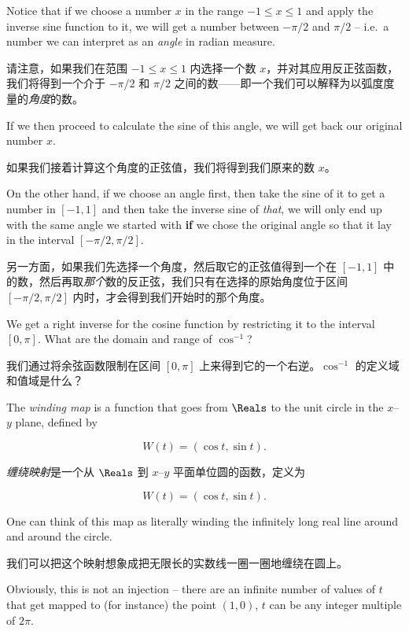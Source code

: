 Notice that if we choose a number $x$ in the range $-1 \leq x \leq 1$ and apply
the inverse sine function to it, we will get a number between $-\pi/2$ and 
$\pi/2$ -- i.e.\ a number we can interpret as an \emph{angle} in radian measure.

请注意，如果我们在范围 $-1 \leq x \leq 1$ 内选择一个数 $x$，并对其应用反正弦函数，我们将得到一个介于 $-\pi/2$ 和 $\pi/2$ 之间的数——即一个我们可以解释为以弧度度量的\emph{角度}的数。

If we then proceed to calculate the sine of this angle, we will get back our
original number $x$.

如果我们接着计算这个角度的正弦值，我们将得到我们原来的数 $x$。

On the other hand, if we choose an angle first, then take the sine of it to
get a number in $[-1,1]$ and then take the inverse sine of \emph{that},
we will only end up with the same angle we started with {\bf if} 
we chose the original angle
so that it lay in the interval $[-\pi/2, \pi/2]$.

另一方面，如果我们先选择一个角度，然后取它的正弦值得到一个在 $[-1,1]$ 中的数，然后再取\emph{那个}数的反正弦，我们只有在选择的原始角度位于区间 $[-\pi/2, \pi/2]$ 内时，才会得到我们开始时的那个角度。

\begin{exer}
We get a right inverse for the cosine function by restricting it to
the interval $[0,\pi]$. What are the domain and range of $\cos^{-1}$?
\end{exer}

\begin{exer}
我们通过将余弦函数限制在区间 $[0,\pi]$ 上来得到它的一个右逆。$\cos^{-1}$ 的定义域和值域是什么？
\end{exer}

The \emph{winding map} is a function that goes 
from $\Reals$ to the unit circle in the $x$--$y$ plane, defined by

\[ W(t) = (\cos{t}, \sin{t}). \]

\emph{缠绕映射}是一个从 $\Reals$ 到 $x$--$y$ 平面单位圆的函数，定义为

\[ W(t) = (\cos{t}, \sin{t}). \]

One can think of this map as literally winding the infinitely long
real line around and around the circle.

我们可以把这个映射想象成把无限长的实数线一圈一圈地缠绕在圆上。

Obviously, this is not an
injection -- there are an infinite number of values of $t$ that 
get mapped to (for instance) the point $(1,0)$, $t$ can be any integer
multiple of $2\pi$.

